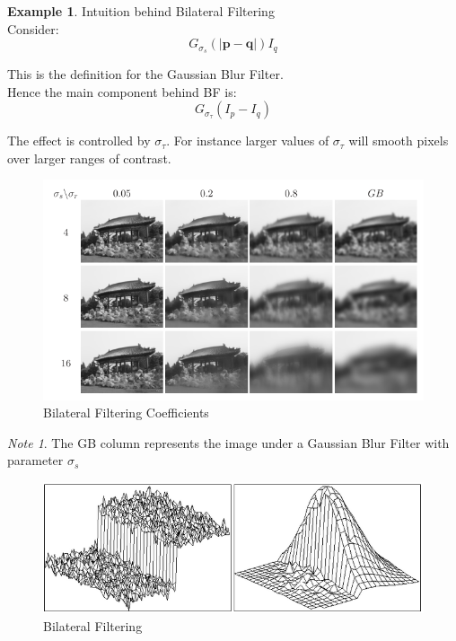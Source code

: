\documentclass{article}
\theoremstyle{definition}
\newtheorem{ex}{Example}[subsection]
\theoremstyle{remark}
\newtheorem*{nb}{Note}
\begin{document}
\begin{ex} Intuition behind Bilateral Filtering\\

\noindent Consider:
\begin{equation*}
G_{\sigma_s}(|\pmb{p} - \pmb{q}|)I_q
\end{equation*}

\noindent This is the definition for the Gaussian Blur Filter.\\

\noindent Hence the main component behind BF is:
\begin{equation*}
    G_{\sigma_\tau}(I_p - I_q)
\end{equation*}

\noindent The effect is controlled by $ \sigma_\tau $. For instance larger values of $ \sigma_\tau $ will smooth pixels over larger ranges of contrast.
\end{ex}

\begin{figure}[h!]
    \centering
    \includegraphics[width=\textwidth]{bilat_filt_coeffs}
    \caption{Bilateral Filtering Coefficients}
    \label{fig:bilat_filt}
\end{figure}

\begin{nb}
The GB column represents the image under a Gaussian Blur Filter with parameter $ \sigma_s $
\end{nb}


\begin{figure}[h!]
    \centering
    \includegraphics[width=\textwidth]{bilat_filt_effect}
    \caption{Bilateral Filtering}
    \label{fig:bilat_filt_alt}
\end{figure}
\end{document}
